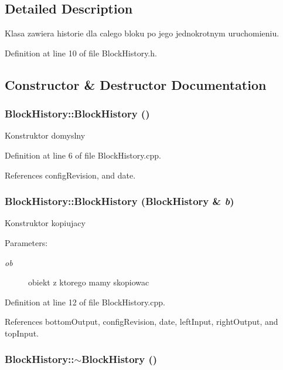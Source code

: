 \subsection{Detailed Description}
Klasa zawiera historie dla calego bloku po jego jednokrotnym uruchomieniu. 

Definition at line 10 of file BlockHistory.h.

\subsection{Constructor \& Destructor Documentation}
\hypertarget{classBlockHistory_c489ea0976659cf022e67ef750162313}{
\subsubsection[BlockHistory]{\setlength{\rightskip}{0pt plus 5cm}BlockHistory::BlockHistory ()}}
\label{classBlockHistory_c489ea0976659cf022e67ef750162313}


Konstruktor domyslny 

Definition at line 6 of file BlockHistory.cpp.

References configRevision, and date.\hypertarget{classBlockHistory_26fc96f5239718c5866d2682161c1800}{
\subsubsection[BlockHistory]{\setlength{\rightskip}{0pt plus 5cm}BlockHistory::BlockHistory ({\bf BlockHistory} \& {\em b})}}
\label{classBlockHistory_26fc96f5239718c5866d2682161c1800}


Konstruktor kopiujacy \begin{Desc}
\item[Parameters:]
\begin{description}
\item[{\em ob}]obiekt z ktorego mamy skopiowac \end{description}
\end{Desc}


Definition at line 12 of file BlockHistory.cpp.

References bottomOutput, configRevision, date, leftInput, rightOutput, and topInput.\hypertarget{classBlockHistory_0647b0c5491b4755250ee1e0d5cb9a8f}{
\subsubsection[$\sim$BlockHistory]{\setlength{\rightskip}{0pt plus 5cm}BlockHistory::$\sim$BlockHistory ()}}
\label{classBlockHistory_0647b0c5491b4755250ee1e0d5cb9a8f}


